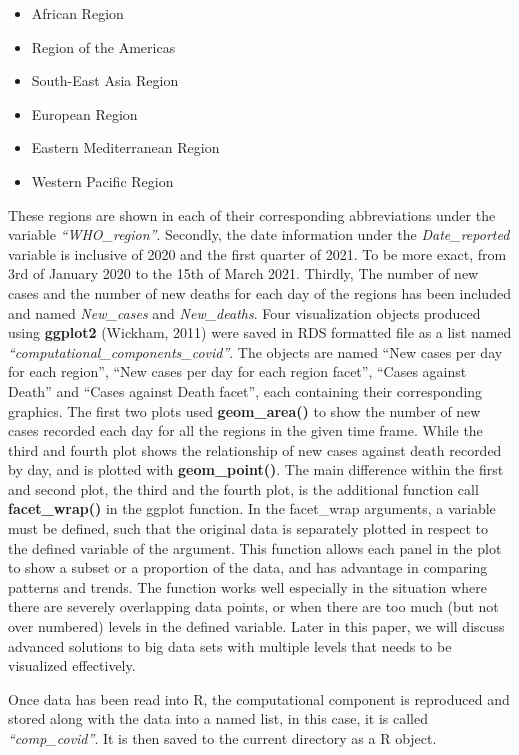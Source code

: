 \documentclass[
]{article}
\begin{document}
\begin{itemize}
\item
  African Region
\item
  Region of the Americas
\item
  South-East Asia Region
\item
  European Region
\item
  Eastern Mediterranean Region
\item
  Western Pacific Region
\end{itemize}

These regions are shown in each of their corresponding abbreviations
under the variable \emph{``WHO\_region''}. Secondly, the date
information under the \emph{Date\_reported} variable is inclusive of
2020 and the first quarter of 2021. To be more exact, from 3rd of
January 2020 to the 15th of March 2021. Thirdly, The number of new cases
and the number of new deaths for each day of the regions has been
included and named \emph{New\_cases} and \emph{New\_deaths}. Four
visualization objects produced using \textbf{ggplot2} (Wickham, 2011)
were saved in RDS formatted file as a list named
\emph{``computational\_components\_covid''}. The objects are named ``New
cases per day for each region'', ``New cases per day for each region
facet'', ``Cases against Death'' and ``Cases against Death facet'', each
containing their corresponding graphics. The first two plots used
\textbf{geom\_area()} to show the number of new cases recorded each day
for all the regions in the given time frame. While the third and fourth
plot shows the relationship of new cases against death recorded by day,
and is plotted with \textbf{geom\_point()}. The main difference within
the first and second plot, the third and the fourth plot, is the
additional function call \textbf{facet\_wrap()} in the ggplot function.
In the facet\_wrap arguments, a variable must be defined, such that the
original data is separately plotted in respect to the defined variable
of the argument. This function allows each panel in the plot to show a
subset or a proportion of the data, and has advantage in comparing
patterns and trends. The function works well especially in the situation
where there are severely overlapping data points, or when there are too
much (but not over numbered) levels in the defined variable. Later in
this paper, we will discuss advanced solutions to big data sets with
multiple levels that needs to be visualized effectively.

Once data has been read into R, the computational component is
reproduced and stored along with the data into a named list, in this
case, it is called \emph{``comp\_covid''}. It is then saved to the
current directory as a R object.
\end{document}

